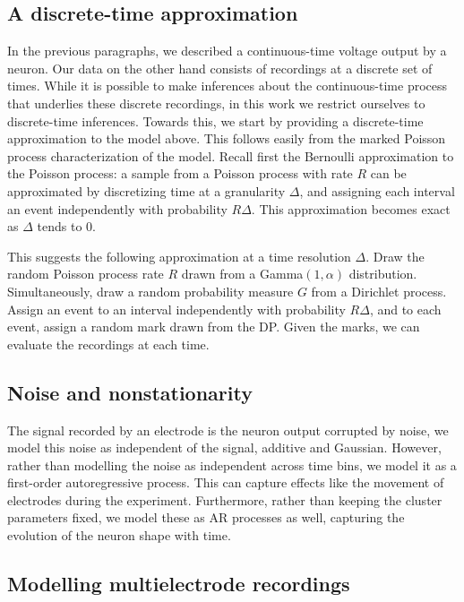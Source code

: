 
\subsection{A discrete-time approximation}
In the previous paragraphs, we described a continuous-time voltage output by a neuron. Our data on the other hand consists of recordings
at a discrete set of times. While it is possible to make inferences about the continuous-time process that underlies these discrete recordings,
in this work we restrict ourselves to discrete-time inferences. Towards this, we start by providing a discrete-time approximation to the model above. 
This follows easily from the marked Poisson process characterization of the model.
Recall first the Bernoulli approximation to the Poisson process: a sample from a Poisson process with rate $R$ can be approximated by discretizing
time at a granularity $\Delta$, and assigning each interval an event independently with probability $R\Delta$. This approximation becomes exact
as $\Delta$ tends to $0$.

This suggests the following approximation at a time resolution $\Delta$. Draw the random Poisson process rate $R$ drawn from a Gamma$(1,\alpha)$ 
distribution. Simultaneously, draw a random probability measure
 $G$ from a Dirichlet process. Assign an event to an interval independently with probability $R\Delta$, and to each event, assign a random mark drawn 
from the DP. Given the marks, we can evaluate the recordings at each time.

\subsection{Noise and nonstationarity}
The signal recorded by an electrode is the neuron output corrupted by noise, we model this noise as independent of the signal, additive and Gaussian.
However, rather than modelling the noise as independent across time bins, we model it as a first-order autoregressive process. This can capture
effects like the movement of electrodes during the experiment. Furthermore, rather than keeping the cluster parameters fixed, we model these as
AR processes as well, capturing the evolution of the neuron shape with time.

\subsection{Modelling multielectrode recordings}

